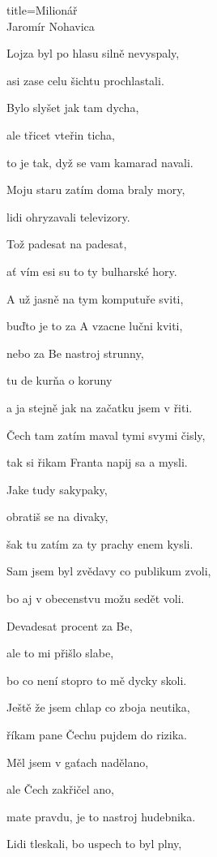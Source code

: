 \begin{song}{title=\centering Milionář \\\normalsize Jaromír Nohavica  \vspace*{-0.3cm}}
\begin{centerjustified}
\begin{varwidth}[t]{0.48\textwidth}
\sloka
Lojza byl po hlasu silně nevyspaly, 

asi zase celu šichtu prochlastali.

Bylo slyšet jak tam dycha, 

ale třicet vteřin ticha, 

to je tak, dyž se vam kamarad navali.

\sloka
Moju staru zatím doma braly mory,

lidi ohryzavali televizory.



\end{varwidth}\begin{varwidth}[t]{0.5\textwidth}\setlength{\parindent}{\pindent}\vspace*{1.07cm}  %

Tož padesat na padesat, 

ať vím esi su to ty bulharské hory.

\sloka
A už jasně na tym komputuře sviti, 

buďto je to za A vzacne lučni kviti, 

nebo za Be nastroj strunny, 

tu de kurňa o koruny 

a ja stejně jak na začatku jsem v řiti.

\sloka
Čech tam zatím maval tymi svymi čisly,

tak si řikam Franta napij sa a mysli. 

Jake tudy sakypaky, 

obratiš se na divaky,

šak tu zatím za ty prachy enem kysli. 

\sloka
Sam jsem byl zvědavy co publikum zvoli, 

bo aj v obecenstvu možu sedět voli. 

Devadesat procent za Be, 

ale to mi přišlo slabe, 

bo co není stopro to mě dycky skoli. 

\sloka
Ještě že jsem chlap co zboja neutika, 

říkam pane Čechu pujdem do rizika. 

Měl jsem v gaťach nadělano, 

ale Čech zakřičel ano, 

mate pravdu, je to nastroj hudebnika.

\sloka 
Lidi tleskali, bo uspech to byl plny, 


\end{varwidth}
\end{centerjustified}
\end{song}
